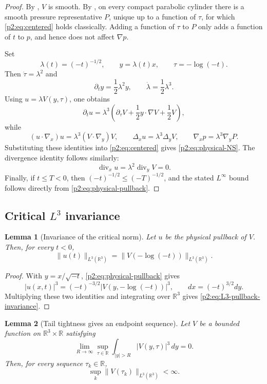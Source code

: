 \documentclass[11pt]{amsart}
\theoremstyle{plain}
\newtheorem{lemma}[lemma]{Lemma}
\theoremstyle{definition}
\theoremstyle{remark}
\numberwithin{equation}{section}
\newcommand{\R}{\mathbb R}
\newcommand{\divergence}{\operatorname{div}}
\begin{document}
\begin{proof}
By , \(V\) is smooth.  By
, on every compact parabolic cylinder there is a
smooth pressure representative \(P\), unique up to a function of \(\tau\), for
which \eqref{p2:eq:centered} holds classically.  Adding a function of \(\tau\) to
\(P\) only adds a function of \(t\) to \(p\), and hence does not affect
\(\nabla p\).

Set
\[
   \lambda(t)=(-t)^{-1/2},\qquad
   y=\lambda(t)x,\qquad
   \tau=-\log(-t).
\]
Then \(\dot \tau=\lambda^2\) and
\[
   \partial_t y=\frac12\lambda^2 y,
   \qquad
   \dot\lambda=\frac12\lambda^3 .
\]
Using \(u=\lambda V(y,\tau)\), one obtains
\[
   \partial_tu
   =
   \lambda^3
   \left(
      \partial_\tau V+\frac12y\cdot\nabla V+\frac12V
   \right),
\]
while
\[
   (u\cdot\nabla_x)u=\lambda^3(V\cdot\nabla_y)V,
   \qquad
   \Delta_xu=\lambda^3\Delta_yV,
   \qquad
   \nabla_xp=\lambda^3\nabla_yP .
\]
Substituting these identities into \eqref{p2:eq:centered} gives
\eqref{p2:eq:physical-NS}.  The divergence identity follows similarly:
\[
   \divergence_xu=\lambda^2\divergence_yV=0.
\]
Finally, if \(t\le T<0\), then \((-t)^{-1/2}\le(-T)^{-1/2}\), and the stated
\(L^\infty\) bound follows directly from \eqref{p2:eq:physical-pullback}.
\end{proof}

\subsection{\texorpdfstring{Critical \(L^3\) invariance}{Critical L3 invariance}}

\begin{lemma}[Invariance of the critical norm]
\label{p2:lem:L3-pullback-invariance}
Let \(u\) be the physical pullback of \(V\).  Then, for every \(t<0\),
\begin{equation}\label{p2:eq:L3-pullback-invariance}
   \|u(t)\|_{L^3(\R^3)}
   =
   \|V(-\log(-t))\|_{L^3(\R^3)} .
\end{equation}
\end{lemma}

\begin{proof}
With \(y=x/\sqrt{-t}\), \eqref{p2:eq:physical-pullback} gives
\[
   |u(x,t)|^3=(-t)^{-3/2}|V(y,-\log(-t))|^3,
   \qquad
   dx=(-t)^{3/2}dy .
\]
Multiplying these two identities and integrating over \(\R^3\) gives
\eqref{p2:eq:L3-pullback-invariance}.
\end{proof}

\begin{lemma}[Tail tightness gives an endpoint sequence]
\label{p2:lem:tail-tight-sequence-L3}
Let \(V\) be a bounded function on \(\R^3\times\R\) satisfying
\[
   \lim_{R\to\infty}
   \sup_{\tau\in\R}\int_{|y|>R}|V(y,\tau)|^3\,dy=0 .
\]
Then, for every sequence \(\tau_k\in\R\),
\[
   \sup_k\|V(\tau_k)\|_{L^3(\R^3)}<\infty .
\]
\end{lemma}
\end{document}
